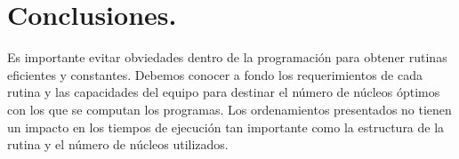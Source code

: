 \documentclass{article}
\begin{document}
\section{Conclusiones.}
Es importante evitar obviedades dentro de la programación para obtener rutinas eficientes y constantes. Debemos conocer a fondo los requerimientos de cada rutina y las capacidades del equipo para destinar el número de núcleos óptimos con los que se computan los programas. 
Los ordenamientos presentados no tienen un impacto en los tiempos de ejecución tan importante como la estructura de la rutina y el número de núcleos utilizados.


\end{document}
